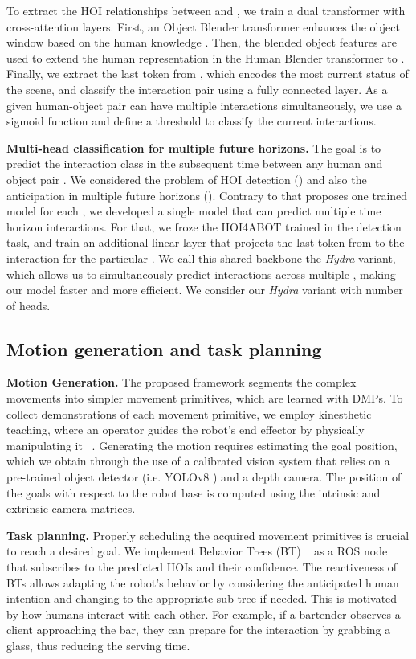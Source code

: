 \documentclass{article}
\begin{document}
To extract the HOI relationships between  and , we train a dual transformer with cross-attention layers. First, an Object Blender transformer enhances the object window  based on the human knowledge . Then, the blended object features  are used to extend the human representation  in the Human Blender transformer to . Finally, we extract the last token from , which encodes the most current status of the scene, and classify the interaction pair  using a fully connected layer. As a given human-object pair can have multiple interactions simultaneously, we use a sigmoid function and define a threshold to classify the current interactions.

\textbf{Multi-head classification for multiple future horizons. }
The goal is to predict the interaction class  in the subsequent time  between any human  and object  pair . We considered  the problem of HOI detection () and also the anticipation in multiple future horizons (). Contrary to \cite{NI2023103741} that proposes one trained model for each , we developed a single model that can predict multiple time horizon interactions. For that, we froze the HOI4ABOT trained in the detection task, and train an additional linear layer that projects the last token from  to the interaction for the particular . We call this shared backbone the \textit{Hydra} variant, which allows us to simultaneously predict interactions across multiple , making our model faster and more efficient. We consider our \textit{Hydra} variant with  number of heads.

\subsection{Motion generation and task planning}
\textbf{Motion Generation.}
The proposed framework segments the complex movements into simpler movement primitives, which are learned with DMPs. To collect demonstrations of each movement primitive, we employ kinesthetic teaching, where an operator guides the robot's end effector by physically manipulating it ~\citep{KinestheticTeaching}. Generating the motion requires estimating the goal position, which we obtain through the use of a calibrated vision system that relies on a pre-trained object detector (i.e. YOLOv8 \citep{Jocher_YOLO_by_Ultralytics_2023}) and a depth camera. The position of the goals with respect to the robot base is computed using the intrinsic and extrinsic camera matrices.




\textbf{Task planning.}
Properly scheduling the acquired movement primitives is crucial to reach a desired goal. We implement Behavior Trees (BT) ~\citep{BehaviorTrees} as a ROS node that subscribes to the predicted HOIs and their confidence. The reactiveness of BTs allows adapting the robot's behavior by considering the anticipated human intention and changing to the appropriate sub-tree if needed. This is motivated by how humans interact with each other. For example, if a bartender observes a client approaching the bar, they can prepare for the interaction by grabbing a glass, thus reducing the serving time. 
\end{document}
